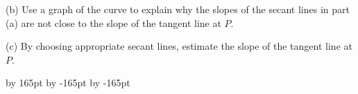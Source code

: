 \documentclass{sebase}
\begin{document}
\begin{multicols}{2}
\begin{ExerciseList}
\begin{ExerciseList}
%

\item[(b)] 
\GCALCXT%
Use a graph of the curve to explain why the slopes of the secant lines in
part (a) are not close to the slope of the tangent line at $P$.\\[3pt]
%

%

\item[(c)] By choosing appropriate secant lines, estimate the slope of the
tangent line at $P$.\\[3pt]
%

%
\end{ExerciseList}
\end{ExerciseList}

\end{multicols}
\advance \leftskip by 165pt
\advance\hsize by -165pt
\advance\linewidth by -165pt
%
\end{document}
